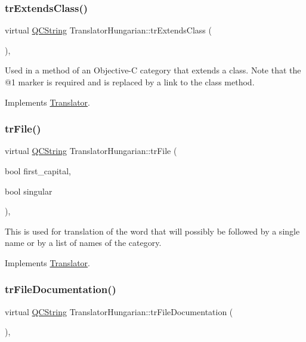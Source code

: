 \subsubsection{\texorpdfstring{trExtendsClass()}{trExtendsClass()}}
{\footnotesize\ttfamily virtual \mbox{\hyperlink{class_q_c_string}{Q\+C\+String}} Translator\+Hungarian\+::tr\+Extends\+Class (\begin{DoxyParamCaption}{ }\end{DoxyParamCaption})\hspace{0.3cm}{\ttfamily [inline]}, {\ttfamily [virtual]}}

Used in a method of an Objective-\/C category that extends a class. Note that the @1 marker is required and is replaced by a link to the class method. 

Implements \mbox{\hyperlink{class_translator}{Translator}}.

\mbox{\label{class_translator_hungarian_a814e3c92d7c0ec0b5f2bc80cbc13d6fe}} 
\subsubsection{\texorpdfstring{trFile()}{trFile()}}
{\footnotesize\ttfamily virtual \mbox{\hyperlink{class_q_c_string}{Q\+C\+String}} Translator\+Hungarian\+::tr\+File (\begin{DoxyParamCaption}\item[{bool}]{first\+\_\+capital,  }\item[{bool}]{singular }\end{DoxyParamCaption})\hspace{0.3cm}{\ttfamily [inline]}, {\ttfamily [virtual]}}

This is used for translation of the word that will possibly be followed by a single name or by a list of names of the category. 

Implements \mbox{\hyperlink{class_translator}{Translator}}.

\mbox{\label{class_translator_hungarian_a4d1e4fed3a2b5fb5cf75f4d88e87fa41}} 
\subsubsection{\texorpdfstring{trFileDocumentation()}{trFileDocumentation()}}
{\footnotesize\ttfamily virtual \mbox{\hyperlink{class_q_c_string}{Q\+C\+String}} Translator\+Hungarian\+::tr\+File\+Documentation (\begin{DoxyParamCaption}{ }\end{DoxyParamCaption})\hspace{0.3cm}{\ttfamily [inline]}, {\ttfamily [virtual]}}


